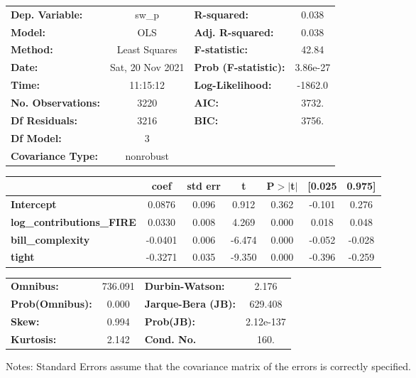 \begin{center}
\begin{tabular}{lclc}
\toprule
\textbf{Dep. Variable:}           &      sw\_p       & \textbf{  R-squared:         } &     0.038   \\
\textbf{Model:}                   &       OLS        & \textbf{  Adj. R-squared:    } &     0.038   \\
\textbf{Method:}                  &  Least Squares   & \textbf{  F-statistic:       } &     42.84   \\
\textbf{Date:}                    & Sat, 20 Nov 2021 & \textbf{  Prob (F-statistic):} &  3.86e-27   \\
\textbf{Time:}                    &     11:15:12     & \textbf{  Log-Likelihood:    } &   -1862.0   \\
\textbf{No. Observations:}        &        3220      & \textbf{  AIC:               } &     3732.   \\
\textbf{Df Residuals:}            &        3216      & \textbf{  BIC:               } &     3756.   \\
\textbf{Df Model:}                &           3      & \textbf{                     } &             \\
\textbf{Covariance Type:}         &    nonrobust     & \textbf{                     } &             \\
\bottomrule
\end{tabular}
\begin{tabular}{lcccccc}
                                  & \textbf{coef} & \textbf{std err} & \textbf{t} & \textbf{P$> |$t$|$} & \textbf{[0.025} & \textbf{0.975]}  \\
\midrule
\textbf{Intercept}                &       0.0876  &        0.096     &     0.912  &         0.362        &       -0.101    &        0.276     \\
\textbf{log\_contributions\_FIRE} &       0.0330  &        0.008     &     4.269  &         0.000        &        0.018    &        0.048     \\
\textbf{bill\_complexity}         &      -0.0401  &        0.006     &    -6.474  &         0.000        &       -0.052    &       -0.028     \\
\textbf{tight}                    &      -0.3271  &        0.035     &    -9.350  &         0.000        &       -0.396    &       -0.259     \\
\bottomrule
\end{tabular}
\begin{tabular}{lclc}
\textbf{Omnibus:}       & 736.091 & \textbf{  Durbin-Watson:     } &     2.176  \\
\textbf{Prob(Omnibus):} &   0.000 & \textbf{  Jarque-Bera (JB):  } &   629.408  \\
\textbf{Skew:}          &   0.994 & \textbf{  Prob(JB):          } & 2.12e-137  \\
\textbf{Kurtosis:}      &   2.142 & \textbf{  Cond. No.          } &      160.  \\
\bottomrule
\end{tabular}
\end{center}

Notes: \newline
 [1] Standard Errors assume that the covariance matrix of the errors is correctly specified.